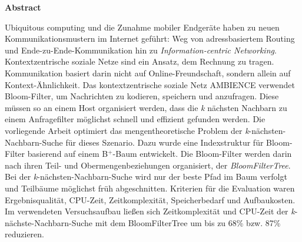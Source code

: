%
%
\vspace*{2cm}

\begin{center}
    \textbf{Abstract}
\end{center}

\vspace*{1cm}

\noindent Ubiquitous computing und die Zunahme mobiler Endgeräte haben zu neuen Kommunikationsmustern im Internet geführt: Weg von adressbasiertem Routing und Ende-zu-Ende-Kommunikation hin zu \textit{Information-centric Networking}. Kontextzentrische soziale Netze sind ein Ansatz, dem Rechnung zu tragen. Kommunikation basiert darin nicht auf Online-Freundschaft, sondern allein auf Kontext-Ähnlichkeit. Das kontextzentrische soziale Netz AMBIENCE verwendet Bloom-Filter, um Nachrichten zu kodieren, speichern und anzufragen. Diese müssen so an einem Host organisiert werden, dass die \textit{k} nächsten Nachbarn zu einem Anfragefilter möglichst schnell und effizient gefunden werden. Die vorliegende Arbeit optimiert das mengentheoretische Problem der \textit{k}-nächsten-Nachbarn-Suche für dieses Szenario. Dazu wurde eine Indexstruktur für Bloom-Filter basierend auf einem B$^+$-Baum entwickelt. Die Bloom-Filter werden darin nach ihren Teil- und Obermengenbeziehungen organisiert, der \textit{BloomFilterTree}. Bei der \textit{k}-nächsten-Nachbarn-Suche wird nur der beste Pfad im Baum verfolgt und Teilbäume möglichst früh abgeschnitten. Kriterien für die Evaluation waren Ergebnisqualität, CPU-Zeit, Zeitkomplexität, Speicherbedarf und Aufbaukosten. Im verwendeten Versuchsaufbau ließen sich Zeitkomplexität und CPU-Zeit der \textit{k}-nächste-Nachbarn-Suche mit dem BloomFilterTree um bis zu 68\% bzw. 87\% reduzieren. 